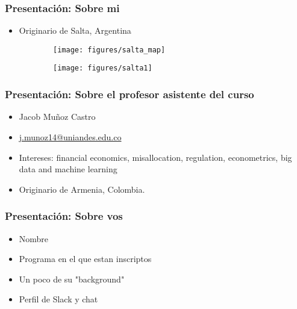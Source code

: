 \documentclass[
  shownotes,
  xcolor={svgnames},
  hyperref={colorlinks,citecolor=DarkBlue,linkcolor=DarkRed,urlcolor=DarkBlue}
  ]{beamer}
\begin{document}
\begin{frame}

\frametitle{Presentación: Sobre mi}
\begin{itemize}
    \item Originario de Salta, Argentina
  \end{itemize}



\begin{figure}[H] \centering
  \captionsetup{justification=centering}

  \centering
  \begin{subfigure}{0.45\linewidth}
    \centering
    \texttt{[image: figures/salta\_map]}
  \end{subfigure}
  \begin{subfigure}{0.45\linewidth}
    \centering
    \texttt{[image: figures/salta1]}
  \end{subfigure}
\end{figure}

\end{frame}


\begin{frame}
\frametitle{Presentación: Sobre el profesor asistente del curso}

  \begin{itemize}
      \item  Jacob Muñoz Castro
      \medskip
      \item \href{mailto:j.munoz14@uniandes.edu.co}{j.munoz14@uniandes.edu.co}
      \medskip
      \item Intereses: financial economics, misallocation, regulation, econometrics,  big data and machine learning
      \medskip
      \item Originario de Armenia, Colombia.

  \end{itemize}

\end{frame}

\begin{frame}
\frametitle{Presentación: Sobre vos}

    \begin{itemize}
      \item Nombre
      \bigskip
      \item Programa en el que estan inscriptos
      \bigskip
      \item Un poco de su "background" 
      \bigskip
      \item Perfil de Slack y chat
    \end{itemize}
\end{frame}
\end{document}
